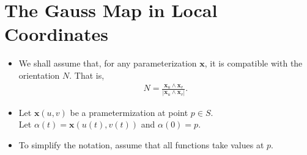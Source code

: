\documentclass[10pt]{article}
\newcommand{\ve}[1]{\mathbf{#1}}
\begin{document}
  \section{The Gauss Map in Local Coordinates}

  \begin{itemize}
    \item We shall assume that, for any parameterization $\ve{x}$, it is compatible with the orientation $N$. That is,
    \begin{align*}
      N = \frac{\ve{x}_u \wedge \ve{x}_v}{|\ve{x}_u \wedge \ve{x}_v|}.
    \end{align*}

    \item Let $\ve{x}(u,v)$ be a prametermization at point $p \in S$.\\
    Let $\alpha(t) = \ve{x}(u(t), v(t))$ and $\alpha(0) = p$.

    \item To simplify the notation, assume that all functions take values at $p$.


\end{itemize}
\end{document}
